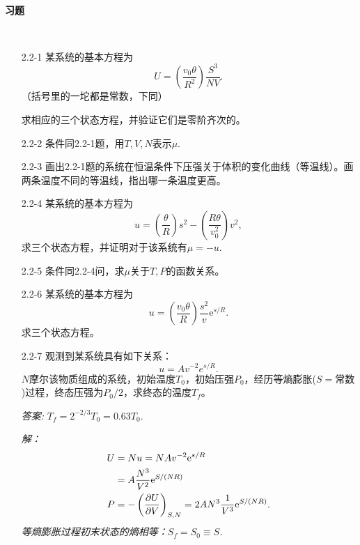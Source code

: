 \ 

{\bf \Large 习题}

\ 

\begin{enumerate}
	\item[2.2-1]
		某系统的基本方程为
		\[
			U = \left( \frac{v_0 \theta}{R^2} \right) \frac{S^3}{NV}.
		\]
		（括号里的一坨都是常数，下同）

		求相应的三个状态方程，并验证它们是零阶齐次的。
	\item[2.2-2]
		条件同2.2-1题，用$T, V, N$表示$\mu$.
	\item[2.2-3]
		画出2.2-1题的系统在恒温条件下压强关于体积的变化曲线（等温线）。画两条温度不同的等温线，指出哪一条温度更高。
	\item[2.2-4]
		某系统的基本方程为
		\[
			u = \left( \frac{\theta}{R} \right) s^2 - \left( \frac{R\theta}{v_0^2} \right) v^2,
		\]
		求三个状态方程，并证明对于该系统有$\mu = -u$.
	\item[2.2-5]
		条件同2.2-4问，求$\mu$关于$T, P$的函数关系。
	\item[2.2-6]
		某系统的基本方程为
		\[
			u = \left( \frac{v_0 \theta}{R} \right) \frac{s^2}{v} \mathrm{e}^{s/R}.
		\]
		求三个状态方程。
	\item[2.2-7]
		观测到某系统具有如下关系：
		\[
			u = Av^{-2} e^{s/R}.
		\]
		$N$摩尔该物质组成的系统，初始温度$T_0$，初始压强$P_0$，经历等熵膨胀($S = \text{常数}$)过程，终态压强为$P_0 / 2$，求终态的温度$T_f$。
		\begin{flushright}
			{\it 答案: }$T_f = 2^{-2/3} T_0 = 0.63 T_0.$
		\end{flushright}

		{\it 解：
			\begin{align*}
				U &= Nu = NAv^{-2} \mathrm{e}^{s/R} \\
				&= A \frac{N^3}{V^2} \mathrm{e}^{S/(NR)} \\
				P &= -\left( \frac{\partial U}{\partial V} \right)_{S, N} = 2AN^3 \frac{1}{V^3} \mathrm{e}^{S / (NR)}.
			\end{align*}
			等熵膨胀过程初末状态的熵相等：$S_f = S_0 \equiv S$.

}
\end{enumerate}
